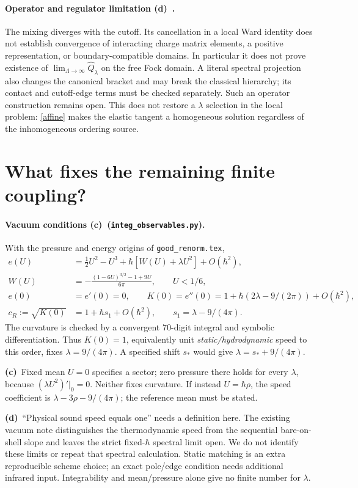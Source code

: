 \documentclass[11pt,a4paper]{article}
\newcommand{\C}{\textbf{(c)}\ }
\newcommand{\D}{\textbf{(d)}\ }
\newcommand{\file}[1]{\nolinkurl{#1}}
\newcommand{\obs}{\file{integ_observables.py}}
\begin{document}
\paragraph{Operator and regulator limitation \D.}
The mixing diverges with the cutoff. Its cancellation in a local Ward
identity does not establish convergence of interacting charge matrix
elements, a positive representation, or boundary-compatible domains.
In particular it does not prove existence of
$\lim_{\Lambda\to\infty}\widehat Q_\lambda$ on the free Fock domain.
A literal spectral projection also changes the canonical bracket and may
break the classical hierarchy; its contact and cutoff-edge terms must be
checked separately. Such an operator construction remains open.
This does not restore a $\lambda$ selection in the local problem:
\eqref{affine} makes the elastic tangent a homogeneous solution regardless
of the inhomogeneous ordering source.

\section{What fixes the remaining finite coupling?}
\paragraph{Vacuum conditions \C (\obs).}
With the pressure and energy origins of \file{good_renorm.tex},
\begin{align}
 e(U)&=\tfrac12U^2-U^3+\hbar[W(U)+\lambda U^2]+O(\hbar^2),\\
 W(U)&=-\frac{(1-6U)^{3/2}-1+9U}{6\pi},\qquad U<1/6,\\
 e(0)&=e'(0)=0,\qquad
 K(0)=e''(0)=1+\hbar(2\lambda-9/(2\pi))+O(\hbar^2),\\
 c_R:=\sqrt{K(0)}&=1+\hbar s_1+O(\hbar^2),\qquad
 s_1=\lambda-9/(4\pi).\label{static}
\end{align}
The curvature is checked by a convergent 70-digit integral and symbolic
differentiation. Thus $K(0)=1$, equivalently unit \emph{static/hydrodynamic}
speed to this order, fixes $\lambda=9/(4\pi)$.
A specified shift $s_*$ would give $\lambda=s_*+9/(4\pi)$.

\C Fixed mean $U=0$ specifies a sector; zero pressure there holds for
every $\lambda$, because $(\lambda U^2)'|_0=0$. Neither fixes curvature.
If instead $U=\hbar\rho$, the speed coefficient is
$\lambda-3\rho-9/(4\pi)$; the reference mean must be stated.

\D ``Physical sound speed equals one'' needs a definition here.
The existing vacuum note distinguishes the thermodynamic speed from the
sequential bare-on-shell slope and leaves the strict fixed-$\hbar$
spectral limit open. We do not identify these limits or repeat that
spectral calculation. Static matching is an extra reproducible scheme
choice; an exact pole/edge condition needs additional infrared input.
Integrability and mean/pressure alone give no finite number for $\lambda$.
\end{document}
